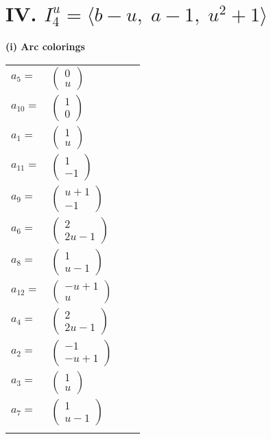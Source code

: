 \documentclass[1p]{elsarticle_modified}
\theoremstyle{definition}
\begin{document}
\centering \section*{IV. $I^u_{4}= \langle b- u,\;a-1,\;u^2+1 \rangle$}
\flushleft \textbf{(i) Arc colorings}\\
\begin{tabular}{m{7pt} m{180pt} m{7pt} m{180pt} }
\flushright $a_{5}=$&$\begin{pmatrix}0\\u\end{pmatrix}$ \\
\flushright $a_{10}=$&$\begin{pmatrix}1\\0\end{pmatrix}$ \\
\flushright $a_{1}=$&$\begin{pmatrix}1\\u\end{pmatrix}$ \\
\flushright $a_{11}=$&$\begin{pmatrix}1\\-1\end{pmatrix}$ \\
\flushright $a_{9}=$&$\begin{pmatrix}u+1\\-1\end{pmatrix}$ \\
\flushright $a_{6}=$&$\begin{pmatrix}2\\2 u-1\end{pmatrix}$ \\
\flushright $a_{8}=$&$\begin{pmatrix}1\\u-1\end{pmatrix}$ \\
\flushright $a_{12}=$&$\begin{pmatrix}- u+1\\u\end{pmatrix}$ \\
\flushright $a_{4}=$&$\begin{pmatrix}2\\2 u-1\end{pmatrix}$ \\
\flushright $a_{2}=$&$\begin{pmatrix}-1\\- u+1\end{pmatrix}$ \\
\flushright $a_{3}=$&$\begin{pmatrix}1\\u\end{pmatrix}$ \\
\flushright $a_{7}=$&$\begin{pmatrix}1\\u-1\end{pmatrix}$\\&\end{tabular}
\end{document}

